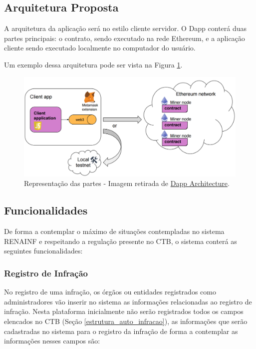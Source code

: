 \subsection{Arquitetura Proposta}

A arquitetura da aplicação será no estilo cliente servidor. O Dapp conterá duas partes principais: o contrato, sendo executado na rede Ethereum, e a aplicação cliente sendo executado localmente no computador do usuário.

Um exemplo dessa arquitetura pode ser vista na Figura \ref{fig:dapp_representacao}.

    \begin{figure}[h]
         \centering
         \includegraphics[scale=0.25]{figuras/capitulo_3/dapp_representacao_comunicacao.png}
         \caption{Representação das partes - Imagem retirada de \href{https://sites.google.com/site/blockchaintutorial/dapp-architecture}{Dapp Architecture}.}
         \label{fig:dapp_representacao}
    \end{figure}



\subsection{Funcionalidades}
\label{section:funcionalidades_propostas}

De forma a contemplar o máximo de situações contempladas no sistema RENAINF e respeitando a regulação presente no CTB, o sistema conterá as seguintes funcionalidades:


    \subsubsection{Registro de Infração}
    
        No registro de uma infração, os órgãos ou entidades registrados como administradores vão inserir no sistema as informações relacionadas ao registro de infração. Nesta plataforma inicialmente não serão registrados todos os campos elencados no CTB (Seção \ref{estrutura_auto_infracao}), as informações que serão cadastradas no sistema para o registro da infração de forma a contemplar as informações nesses campos são:
        

